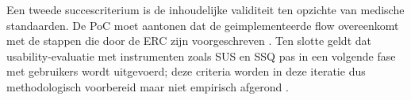  Een tweede succescriterium is de inhoudelijke validiteit ten opzichte van medische standaarden. De PoC moet aantonen dat de geimplementeerde flow overeenkomt met de stappen die door de ERC zijn voorgeschreven \cite{ERC2025BLS}. Ten slotte geldt dat usability-evaluatie met instrumenten zoals SUS en SSQ pas in een volgende fase met gebruikers wordt uitgevoerd; deze criteria worden in deze iteratie dus methodologisch voorbereid maar niet empirisch afgerond \cite{Hung2024VR}.